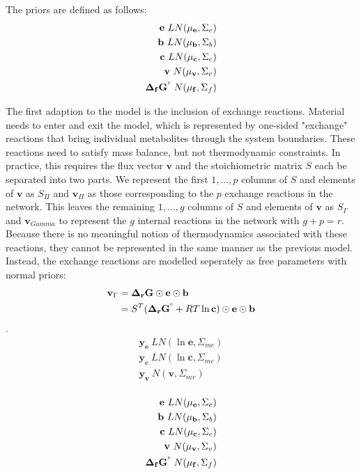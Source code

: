 \documentclass[10pt,letterpaper]{article}
\newcommand{\sdgf}{\Delta_fG^{\degree}}
\newcommand{\dgr}{\Delta_rG}
\newcommand{\sdgr}{\Delta_rG^{\degree}}
\newcommand{\bsdgf}{\mathbf{\sdgf}}
\newcommand{\bdgr}{\mathbf{\dgr}}
\newcommand{\bsdgr}{\mathbf{\sdgr}}
\newcommand{\be}{\mathbf{e}}
\newcommand{\bc}{\mathbf{c}}
\newcommand{\bb}{\mathbf{b}}
\newcommand{\bv}{\mathbf{v}}
\begin{document}
The priors are defined as follows:
\begin{align*}
    \be ~ LN(\mathbf{\mu_e}, \Sigma_e) \\
    \bb ~ LN(\mathbf{\mu_b}, \Sigma_b) \\
    \bc ~ LN(\mathbf{\mu_c}, \Sigma_c) \\
    \bv ~ N(\mathbf{\mu_v}, \Sigma_v) \\
    \bsdgf ~ N(\mathbf{\mu_{f}}, \Sigma_{f}) \\
\end{align*}

The first adaption to the model is the inclusion of exchange reactions.
Material needs to enter and exit the model, which is represented by one-sided "exchange" reactions that bring individual metabolites through the system boundaries.
These reactions need to satisfy mass balance, but not thermodynamic constraints.
In practice, this requires the flux vector $\bv$ and the stoichiometric matrix $S$ each be separated into two parts.
We represent the first $1,...,p$ columns of $S$ and elements of $\bv$ as $S_\Pi$ and $\bv_\Pi$ as those corresponding to the $p$ exchange reactions in the network.
This leaves the remaining $1,...,g$ columns of $S$ and elements of $\bv$ as $S_\Gamma$ and $\bv_{Gamma}$ to represent the $g$ internal reactions in the network with $g+p=r$.
Because there is no meaningful notion of thermodynamics associated with these reactions, they cannot be represented in the same manner as the previous model.
Instead, the exchange reactions are modelled seperately as free parameters with normal priors:
\begin{align}
    \bv_\Gamma &= \bdgr \odot \be \odot \bb \\
        &= S^T (\bsdgr + RT\ln{\bc}) \odot \be \odot \bb \\
\end{align}
.
\begin{align*}
    \mathbf{y_{e}} ~ LN(\ln{\be}, \Sigma_{me}) \\
    \mathbf{y_{c}} ~ LN(\ln{\bc}, \Sigma_{mc}) \\
    \mathbf{y_{v}} ~ N(\bv, \Sigma_{mv}) \\
\end{align*}

\begin{align*}
    \be ~ LN(\mathbf{\mu_e}, \Sigma_e) \\
    \bb ~ LN(\mathbf{\mu_b}, \Sigma_b) \\
    \bc ~ LN(\mathbf{\mu_c}, \Sigma_c) \\
    \bv ~ N(\mathbf{\mu_v}, \Sigma_v) \\
    \bsdgf ~ N(\mathbf{\mu_{f}}, \Sigma_{f}) \\
\end{align*}
\end{document}
